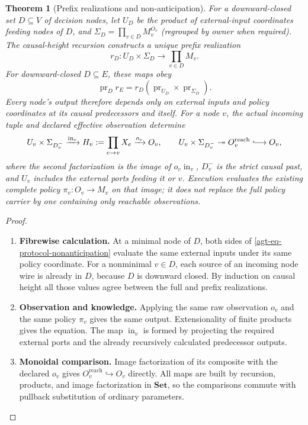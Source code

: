 \documentclass[11pt,a4paper]{article}
\numberwithin{equation}{section}
\newtheorem{theorem}{Theorem}[section]
\theoremstyle{definition}
\theoremstyle{remark}
\theoremstyle{plain}
\providecommand{\Set}{\mathbf{Set}}
\begin{document}
\begin{theorem}[Prefix realizations and non-anticipation]
\label{agt-thm-protocol-prefix}
For a downward-closed set $D\subseteq V$ of decision nodes, let $U_D$
be the product of external-input coordinates feeding nodes of $D$, and
$\Sigma_D=\prod_{v\in D}M_v^{O_v}$ (regrouped by owner when required).
The causal-height recursion constructs a unique prefix realization
\[
 r_D:U_D\times\Sigma_D\longrightarrow\prod_{v\in D}M_v.
\]
For downward-closed $D\subseteq E$, these maps obey
\begin{equation}
 \operatorname{pr}_D r_E
 =r_D(\operatorname{pr}_{U_D}\times\operatorname{pr}_{\Sigma_D}).
 \label{agt-eq-protocol-nonanticipation}
\end{equation}
Every node's output therefore depends only on external inputs and policy
coordinates at its causal predecessors and itself. For a node $v$, the
actual incoming tuple and declared effective observation determine
\[
 U_v\times\Sigma_{D_v^-}\xrightarrow{\operatorname{in}_v}
 H_v:=\prod_{e\to v}X_e\xrightarrow{o_v}O_v,
 \qquad
 U_v\times\Sigma_{D_v^-}\twoheadrightarrow
 O_v^{\mathrm{reach}}\lhook\joinrel\longrightarrow O_v,
\]
where the second factorization is the image of $o_v\operatorname{in}_v$,
$D_v^-$ is the strict causal past, and $U_v$ includes the external
ports feeding it or $v$. Execution evaluates the existing complete
policy $\pi_v:O_v\to M_v$ on that image; it does not replace the full
policy carrier by one containing only reachable observations.
\end{theorem}
\begin{proof}
\leavevmode
\begin{enumerate}[label=\textup{(\arabic*)},leftmargin=*,itemsep=4pt,topsep=3pt]
  \item \textbf{Fibrewise calculation.} At a minimal node of $D$, both sides of
\eqref{agt-eq-protocol-nonanticipation} evaluate the same external
inputs under its same policy coordinate. For a nonminimal $v\in D$,
each source of an incoming node wire is already in $D$, because $D$ is
downward closed. By induction on causal height all those values agree
between the full and prefix realizations.
  \item \textbf{Observation and knowledge.} Applying the same raw
observation $o_v$ and the same policy $\pi_v$ gives the same output. Extensionality of finite products gives the equation. The map
$\operatorname{in}_v$ is formed by projecting the required external
ports and the already recursively calculated predecessor outputs.
  \item \textbf{Monoidal comparison.} Image factorization of its composite with the declared $o_v$ gives
$O_v^{\mathrm{reach}}\hookrightarrow O_v$ directly. All maps are built
by recursion, products, and image factorization in $\Set$, so the
comparisons commute with pullback substitution of ordinary parameters.
\end{enumerate}
\end{proof}
\end{document}
